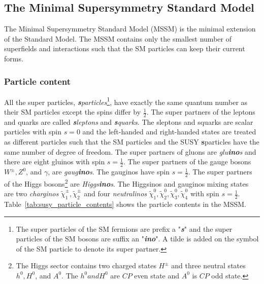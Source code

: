 
\subsection{The Minimal Supersymmetry Standard Model}
\label{subsec:susy_mssm}
The Minimal Supersymmetry Standard Model (MSSM) is the minimal extension of the Standard Model.
The MSSM contains only the smallest number of superfields and interactions such that the SM particles can keep their current forms.


\subsubsection{Particle content}
\label{subsubsec:susy_particle_content}
All the super particles, \textit{\textbf{s}particles}\footnote{The super particles of the SM fermions are prefix a "\textit{\textbf{s}}" and the super particles of the SM bosons are suffix an "\textit{\textbf{ino}}". A tilde is added on the symbol of the SM particle to denote its super partner.}, have exactly the same quantum number as their SM particles except the spins differ by $\frac{1}{2}$.
The super partners of the leptons and quarks are called \textit{\textbf{s}leptons} and \textit{\textbf{s}quarks}.
The sleptons and squarks are scalar particles with spin $s=0$ and the left-handed and right-handed states are treated as different particles such that the SM particles and the SUSY \textbf{s}particles have the same number of degree of freedom.
The super partners of gluons are \textit{glu\textbf{ino}s} and there are eight gluinos with spin $s=\frac{1}{2}$. 
The super partners of the gauge bosons $W^{\pm}, Z^{0}$, and $\gamma$, are \textit{gaug\textbf{ino}s}.
The gauginos have spin $s = \frac{1}{2}$.
The super partners of the Higgs bosons\footnote{The Higgs sector contains two charged states $H^{\pm}$ and three neutral states $h^{0}, H^{0}$, and $A^{0}$. The $h^{0} and H^{0}$ are $CP$ even state and $A^{0}$ is $CP$ odd state.} are \textit{Higgs\textbf{ino}s}.
The Higgsinos and gauginos mixing states are two \textit{charginos} $\tilde{\chi}_{1}^{\pm}, \tilde{\chi}_{2}^{\pm}$ and four \textit{neutralinos} $\tilde{\chi}_{1}^{0}, \tilde{\chi}_{2}^{0}, \tilde{\chi}_{3}^{0}, \tilde{\chi}_{4}^{0}$ with spin $s=\frac{1}{2}$.
Table~\ref{tab:susy_particle_contents} shows the particle contents in the MSSM.

